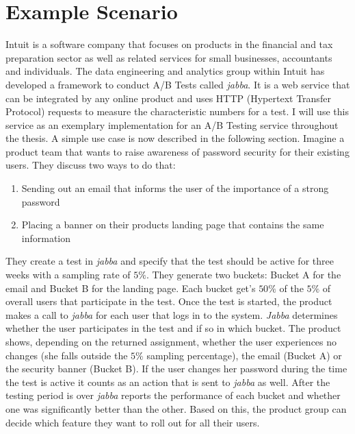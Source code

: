 \documentclass[main.tex]{subfiles}
\begin{document}
\section{Example Scenario}
Intuit is a software company that focuses on products in the  financial and tax preparation sector as well as related services for small businesses, accountants and individuals. The data engineering and analytics group within Intuit has developed a framework to conduct A/B Tests called \emph{jabba}. It is a web service that can be integrated by any online product and uses HTTP (Hypertext Transfer Protocol) requests to measure the characteristic numbers for a test. I will use this service as an exemplary implementation for an A/B Testing service throughout the thesis. A simple use case is now described in the following section.\newline
Imagine a product team that wants to raise awareness of password security for their existing users. They discuss two ways to do that:
\begin{enumerate}
  \item Sending out an email that informs the user of the importance of a strong password
  \item Placing a banner on their products landing page that contains the same information
\end{enumerate}
They create a test in \emph{jabba} and specify that the test should be active for three weeks with a sampling rate of $5\%$. They generate two buckets: Bucket A for the email and Bucket B for the landing page. Each bucket get's $50\%$ of the $5\%$ of overall users that participate in the test. Once the test is started, the product makes a call to \emph{jabba} for each user that logs in to the system. \emph{Jabba} determines whether the user participates in the test and if so in which bucket. The product shows, depending on the returned assignment, whether the user experiences no changes (she falls outside the $5\%$ sampling percentage), the email (Bucket A) or the security banner (Bucket B). If the user changes her password during the time the test is active it counts as an action that is sent to \emph{jabba} as well. After the testing period is over \emph{jabba} reports the performance of each bucket and whether one was significantly better than the other. Based on this, the product group can decide which feature they want to roll out for all their users.
\end{document}
